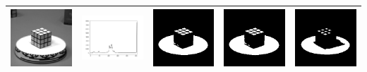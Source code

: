 \documentclass[11pt]{report}
\begin{document}
\begin{table}[htbp]
{\begin{tabular}{|c|c|c|c|c|}
        \includegraphics[width=5cm]{Rubik.png}     & \includegraphics[width=5cm]{Rubik_Hist.png}     & \includegraphics[width=5cm]{Rubik_Otsu.png}     & \includegraphics[width=5cm]{Rubik_Isodata.png}     & \includegraphics[width=5cm]{Rubik_Triangle.png}     \\
        \hline

\end{tabular}}
\end{table}
\end{document}
